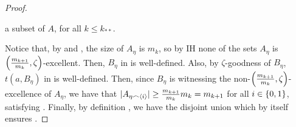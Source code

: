 \begin{lemma}[Claim 5.4.1]
\begin{proof}
\begin{enumerate}
                    a subset of $A$, for all $k \leq k_{**}$.
            \end{enumerate}
            Notice that, by  and
            , the size of $A_\eta$ is $m_k$,
            so by IH none of the sets $A_\eta$ is $\left( \frac{m_{k+1}}{m_{k}}, \zeta \right)$-excellent.
            Then, $B_\eta$ in  is well-defined.
            Also, by $\zeta$-goodness of $B_\eta$, $t(a, B_\eta)$ in  is well-defined.
            Then, since $B_\eta$ is witnessing the non-$\left( \frac{m_{k+1}}{m_{k}}, \zeta \right)$-excellence of $A_\eta$,
            we have that $|A_{\eta \frown \left< i \right>}| \geq \frac{m_{k+1}}{m_k} m_{k} = m_{k+1}$ for all
            $i \in \left\{ 0,1 \right\}$, satisfying .
            Finally, by definition , we have the disjoint union
             which by itself
            ensures .


\end{proof}
\end{lemma}
